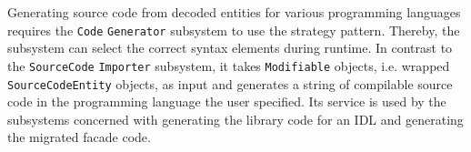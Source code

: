 Generating source code from decoded entities for various programming languages requires the \texttt{Code} \texttt{Generator} subsystem to use the strategy pattern. Thereby, the subsystem can select the correct syntax elements during runtime. In contrast to the \texttt{SourceCode} \texttt{Importer} subsystem, it takes \texttt{Modifiable} objects, i.e. wrapped \texttt{SourceCodeEntity} objects, as input and generates a string of compilable source code in the programming language the user specified. Its service is used by the subsystems concerned with generating the library code for an IDL and generating the migrated facade code.

\begin{figure}[!h]
\end{figure}

